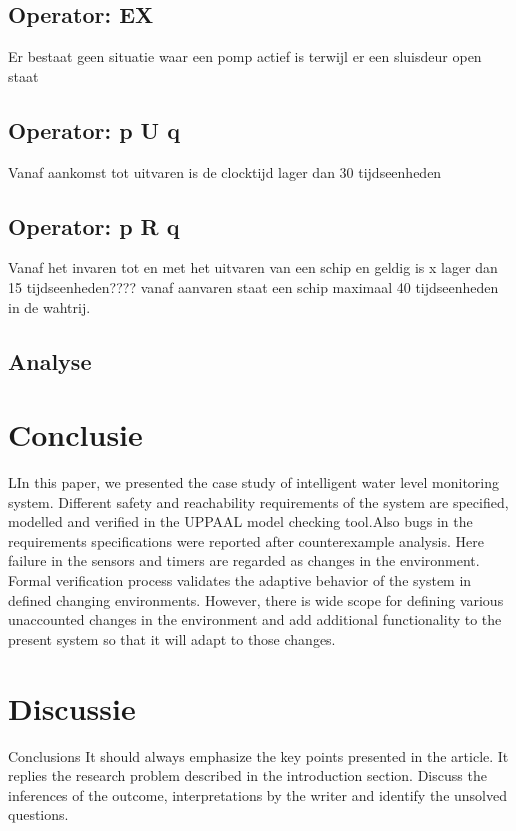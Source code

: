 \documentclass{article}
\begin{document}
	\subsection{Operator: EX}
	Er bestaat geen situatie waar een pomp actief is terwijl er een sluisdeur open staat
	\subsection{Operator: p U q}
	Vanaf aankomst tot uitvaren is de clocktijd lager dan 30 tijdseenheden 
	\subsection{Operator: p R q}
	Vanaf het invaren tot en met het uitvaren van een schip en geldig is x lager dan 15 tijdseenheden????
	vanaf aanvaren staat een schip maximaal 40 tijdseenheden in de wahtrij.
 
\subsection{Analyse}


	\newpage
		\section{Conclusie}
		LIn this paper, we presented the case study of intelligent
		water level monitoring system. Different safety and
		reachability requirements of the system are specified,
		modelled and verified in the UPPAAL model checking
		tool.Also bugs in the requirements specifications were
		reported after counterexample analysis. Here failure in the
		sensors and timers are regarded as changes in the
		environment. Formal verification process validates the
		adaptive behavior of the system in defined changing
		environments. However, there is wide scope for defining
		various unaccounted changes in the environment and add
		additional functionality to the present system so that it
		will adapt to those changes.
		
		
			\newpage
		\section{Discussie}
		Conclusions
		It should always emphasize the key points presented in the article.
		It replies the research problem described in the introduction section. Discuss the inferences of the outcome, interpretations by the writer and identify the unsolved questions. 
		
\end{document}
